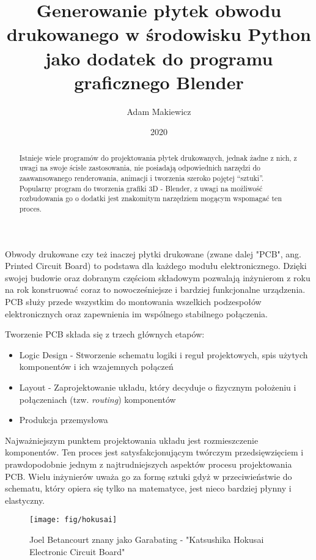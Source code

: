 \documentclass[brudnopis]{xmgr}
\author   {Adam Makiewicz}
\title    {Generowanie płytek obwodu drukowanego w środowisku Python jako dodatek do programu graficznego Blender}
\date     {2020}
\begin{document}
\begin{abstract}
Istnieje wiele programów do projektowania płytek drukowanych, jednak żadne z nich, z uwagi na swoje ścisłe zastosowania, nie posiadają odpowiednich narzędzi do zaawansowanego renderowania, animacji i tworzenia szeroko pojętej “sztuki”. Popularny program do tworzenia grafiki 3D - Blender, z uwagi na możliwość rozbudowania go o dodatki jest znakomitym narzędziem mogącym wspomagać ten proces.
\end{abstract}



\maketitle

\introduction

Obwody drukowane czy też inaczej płytki drukowane (zwane dalej "PCB", ang. Printed Circuit Board) to podstawa dla każdego modułu elektronicznego. Dzięki swojej budowie oraz dobranym częściom składowym pozwalają inżynierom z roku na rok konstruować coraz to nowocześniejsze i bardziej funkcjonalne urządzenia. PCB służy przede wszystkim do montowania wszelkich podzespołów elektronicznych oraz zapewnienia im wspólnego stabilnego połączenia.

Tworzenie PCB składa się z trzech głównych etapów: \cite{Abboud}

\begin{itemize}
\item
Logic Design - Stworzenie schematu logiki i reguł projektowych, spis użytych komponentów i ich wzajemnych połączeń
\item
Layout - Zaprojektowanie układu, który decyduje o fizycznym położeniu i połączeniach (tzw.  \emph{routing}) komponentów
\item
Produkcja przemysłowa
\end{itemize}
    
    Najważniejszym punktem projektowania układu jest rozmieszczenie komponentów. Ten proces jest satysfakcjonującym twórczym przedsięwzięciem i prawdopodobnie jednym z najtrudniejszych aspektów procesu projektowania PCB. Wielu inżynierów uważa go za formę sztuki gdyż w przeciwieństwie do schematu, który opiera się tylko na matematyce, jest nieco bardziej płynny i elastyczny. 

\begin{figure}[!tbh]
\centering
\texttt{[image: fig/hokusai]}
\caption{Joel Betancourt znany jako Garabating - "Katsushika Hokusai Electronic Circuit Board"\label{RYS.1}}
\end{figure}
\end{document}
